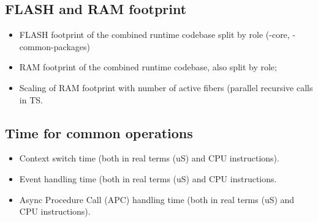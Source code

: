 \subsection{FLASH and RAM footprint}

\begin{itemize}

\item FLASH footprint of the combined runtime codebase split by role (\CON-core, \MCN-common-packages)
\item RAM footprint of the combined runtime codebase, also split by role; 
\item Scaling of RAM footprint with number of active fibers (parallel recursive calls in TS. 
\end{itemize}

\subsection{Time for common \CO operations}

\begin{itemize}
\item Context switch time (both in real terms (uS) and CPU instructions). 
\item Event handling time (both in real terms (uS) and CPU instructions. 
\item Async Procedure Call (APC) handling time (both in real terms (uS) and CPU instructions). 
\end{itemize}






